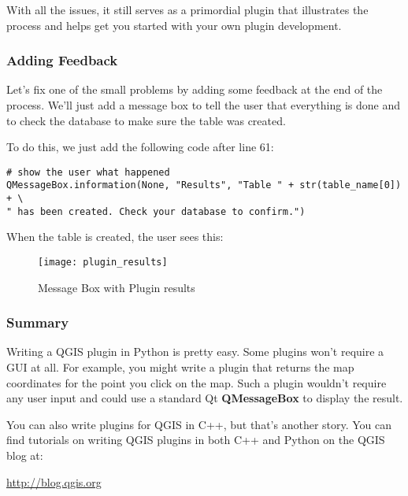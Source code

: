 With all the issues, it still serves as a primordial plugin that illustrates 
the process and helps get you started with your own plugin development.

\subsubsection{Adding Feedback}

Let's fix one of the small problems by adding some feedback at the end of 
the process. We'll just add a message box to tell the user that everything 
is done and to check the database to make sure the table was created.

To do this, we just add the following code after line 61:

\begin{verbatim}
# show the user what happened
QMessageBox.information(None, "Results", "Table " + str(table_name[0]) + \
" has been created. Check your database to confirm.")
\end{verbatim}

When the table is created, the user sees this:

\begin{figure}[ht]
\begin{center}
  \caption{Message Box with Plugin results}\label{fig:plugin_results}\smallskip
  \texttt{[image: plugin\_results]}
\end{center}
\end{figure}

\subsubsection{Summary}
Writing a QGIS plugin in Python is pretty easy. Some plugins won't require a
GUI at all. For example, you might write a plugin that returns the map
coordinates for the point you click on the map. Such a plugin wouldn't
require any user input and could use a standard Qt \textbf{QMessageBox}
to display the result. 

You can also write plugins for QGIS in C++, but that's another story. You can 
find tutorials on writing QGIS plugins in both C++ and Python on the QGIS 
blog at:

\begin{center}
  \url{http://blog.qgis.org} 
\end{center}

